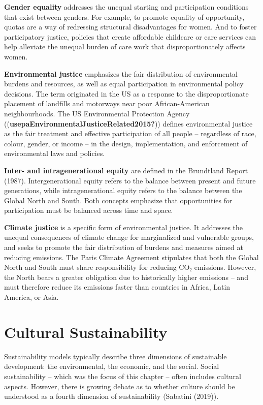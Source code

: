 \documentclass[
  a4paper,
  openany]{book}
\begin{document}
\begin{tcolorbox}
\textbf{Gender equality} addresses the unequal starting and
participation conditions that exist between genders. For example, to
promote equality of opportunity, quotas are a way of redressing
structural disadvantages for women. And to foster participatory justice,
policies that create affordable childcare or care services can help
alleviate the unequal burden of care work that disproportionately
affects women.

\textbf{Environmental justice} emphasizes the fair distribution of
environmental burdens and resources, as well as equal participation in
environmental policy decisions. The term originated in the US as a
response to the disproportionate placement of landfills and motorways
near poor African-American neighbourhoods. The US Environmental
Protection Agency ((\textbf{usepaEnvironmentalJusticeRelated2015?}))
defines environmental justice as the fair treatment and effective
participation of all people -- regardless of race, colour, gender, or
income -- in the design, implementation, and enforcement of
environmental laws and policies.

\textbf{Inter- and intragenerational equity} are defined in the
Brundtland Report (1987). Intergenerational equity refers to the balance
between present and future generations, while intragenerational equity
refers to the balance between the Global North and South. Both concepts
emphasize that opportunities for participation must be balanced across
time and space.

\textbf{Climate justice} is a specific form of environmental justice. It
addresses the unequal consequences of climate change for marginalized
and vulnerable groups, and seeks to promote the fair distribution of
burdens and measures aimed at reducing emissions. The Paris Climate
Agreement stipulates that both the Global North and South must share
responsibility for reducing CO₂ emissions. However, the North bears a
greater obligation due to historically higher emissions -- and must
therefore reduce its emissions faster than countries in Africa, Latin
America, or Asia.

\end{tcolorbox}

\section{Cultural Sustainability}\label{cultural-sustainability}

Sustainability models typically describe three dimensions of sustainable
development: the environmental, the economic, and the social. Social
sustainability -- which was the focus of this chapter -- often includes
cultural aspects. However, there is growing debate as to whether culture
should be understood as a fourth dimension of sustainability (Sabatini
(2019)).
\end{document}
